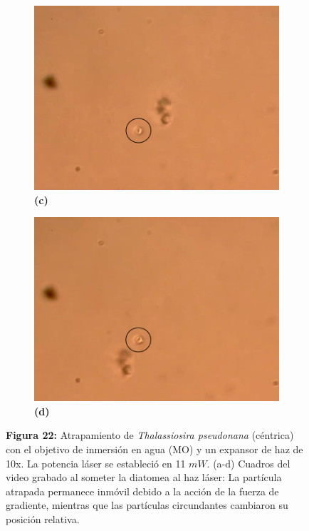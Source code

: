 \documentclass[10pt,aspectratio=1610,compress,dvipsnames]{beamer}
\begin{document}
\begin{frame}
{\begin{figure}
  \begin{subfigure}[b]{0.2\linewidth}
    \includegraphics[width=\linewidth]{Results/Pseudonana water/wpseudonana3.png} %
    \caption*{\textbf{(c)}}
    \label{fig7:c}
  \end{subfigure}\hspace{0.5cm} %
  \begin{subfigure}[b]{0.2\linewidth}
    \includegraphics[width=\linewidth]{Results/Pseudonana water/wpseudonana4.png} %
    \caption*{\textbf{(d)}}
    \label{fig7:d}
  \end{subfigure}
   \captionsetup{labelformat = empty}
  \caption{\textbf{Figura 22: }
Atrapamiento de \textit{Thalassiosira pseudonana} (céntrica) con el objetivo de inmersión en agua (MO) y un expansor de haz de 10x. La potencia láser se estableció en 11 $mW$. (a-d) Cuadros del video grabado al someter la diatomea al haz láser: La partícula atrapada permanece inmóvil debido a la acción de la fuerza de gradiente, mientras que las partículas circundantes cambiaron su posición relativa. }
  \label{poresfrustrules}
\end{figure}

}



\end{frame}
\end{document}
